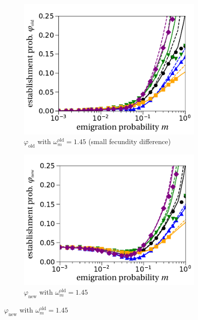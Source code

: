 \documentclass[11pt]{article}
\begin{document}
\begin{figure}[t!]
\begin{subfigure}{.5\textwidth}
  		\includegraphics[width=\linewidth]{fig2c.pdf}
  		\caption{$\varphi_{\text{old}}$ with $\omega^\text{old}_m = 1.45$ (small fecundity difference)}
	\end{subfigure}%
	\begin{subfigure}{.5\textwidth}
 		 \centering
 		 \includegraphics[width=\linewidth]{fig2d.pdf}
  		\caption{$\varphi_{\text{new}}$ with $\omega^\text{old}_m = 1.45$}
	\end{subfigure}

\end{figure}
\end{document}
